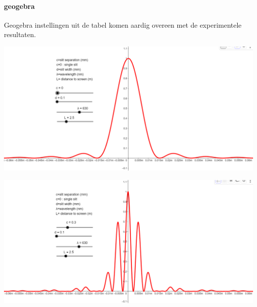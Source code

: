 \documentclass[../../main.tex]{subfiles}
\begin{document}
\paragraph{geogebra}
Geogebra instellingen uit de tabel komen aardig overeen met de experimentele resultaten.


\begin{flushleft}
\begin{minipage}{.45\textwidth}
\includegraphics[width=1\textwidth]{./img/singleslit.PNG}
\end{minipage}%
\hfill
\begin{minipage}{.45\textwidth}
\includegraphics[width=1\textwidth]{./img/doubleslit.PNG}
\end{minipage}
\label{fig:geogebra}
\end{flushleft}
\end{document}
